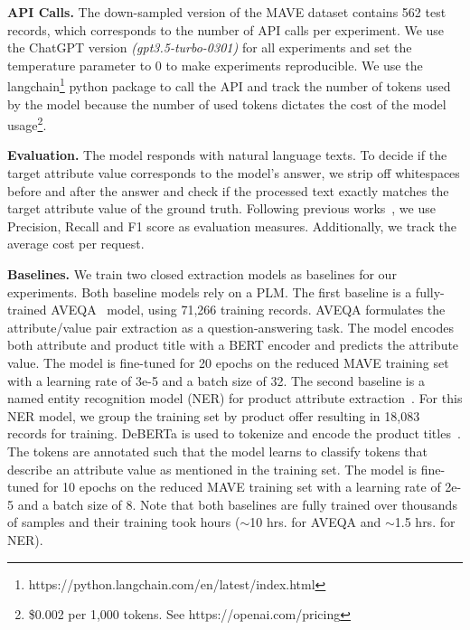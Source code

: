 
\vspace{.1cm}\noindent\textbf{API Calls.}
The down-sampled version of the MAVE dataset contains 562 test records, which corresponds to the number of API calls per experiment. We use the ChatGPT version \emph{(gpt3.5-turbo-0301)} for all experiments and set the temperature parameter to 0 to make experiments reproducible. We use the langchain\footnote{https://python.langchain.com/en/latest/index.html} python package to call the API and track the number of tokens used by the model because the number of used tokens dictates the cost of the model usage\footnote{\$0.002 per 1,000 tokens. See https://openai.com/pricing}.

\vspace{.2cm}\noindent\textbf{Evaluation.}
The model responds with natural language texts. To decide if the target attribute value corresponds to the model's answer, we strip off whitespaces before and after the answer and check if the processed text exactly matches the target attribute value of the ground truth.
Following previous works~\cite{yang_mave_2022, yan_adatag_2021, xu_scaling_2019, zhang_oa-mine_2022}, we use Precision, Recall and F1 score as evaluation measures. Additionally, we track the average cost per request.


\vspace{.2cm}\noindent\textbf{Baselines.}
We train two closed extraction models as baselines for our experiments. Both baseline models rely on a PLM.
The first baseline is a fully-trained AVEQA~\cite{wang_learning_2020} model, using 71,266 training records. AVEQA formulates the attribute/value pair extraction as a question-answering task. The model encodes both attribute and product title with a BERT encoder and predicts the attribute value. The model is fine-tuned for 20 epochs on the reduced MAVE training set with a learning rate of 3e-5 and a batch size of 32.
The second baseline is a named entity recognition model (NER) for product attribute extraction~\cite{putthividhya_bootstrapped_2011}. For this NER model, we group the training set by product offer resulting in 18,083 records for training. DeBERTa is used to tokenize and encode the product titles~\cite {he_deberta_2021}. The tokens are annotated such that the model learns to classify tokens that describe an attribute value as mentioned in the training set. The model is fine-tuned for 10 epochs on the reduced MAVE training set with a learning rate of 2e-5 and a batch size of 8. Note that both baselines are fully trained over thousands of samples and their training took hours ($\sim$10 hrs. for AVEQA and $\sim$1.5 hrs. for NER).

